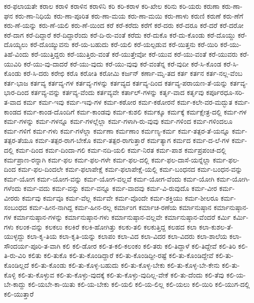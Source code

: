 {ಕರ-ಫಲಾಯತೇ
ಕರಾಲ
ಕರಾಳಿ
ಕರಾಳಿನ
ಕರಾಳಿನಿ
ಕರಿ
ಕರಿ-ಕರಾಳ
ಕರಿ-ಖೇಲ
ಕರಿನು
ಕರಿ-ಯರು
ಕರುಣಾ
ಕರು-ಣಾ-ಘನ
ಕರು-ಣಾ-ನಿಧಿಯೆ
ಕರು-ಣಾ-ಪೂರಿತ
ಕರು-ಣಾ-ಮಯ
ಕರು-ಣಾ-ಮಯಿ
ಕರು-ಣಾಳು
ಕರುಣಿ
ಕರುಣೆ
ಕರು-ಣೆಗೆ
ಕರು-ಣೆ-ಯನ್ನು
ಕರು-ಣೆ-ಯಲಿ
ಕರು-ಣೆ-ಯಿಂದ
ಕರೆ
ಕರೆ-ಕರೆದು
ಕರೆಗೆ
ಕರೆ-ದರು
ಕರೆ-ದರೂ
ಕರೆ-ದರೆ
ಕರೆ-ದರೋ
ಕರೆ-ದಾಗ
ಕರೆ-ದಿದ್ದಾರೆ
ಕರೆ-ದಿದ್ದಾರೆಂದು
ಕರೆ-ದಿ-ರು-ವಂತೆ
ಕರೆದು
ಕರೆ-ದುಕೊ
ಕರೆ-ದು-ಕೊಂಡು
ಕರೆ-ದೊಯ್ದು
ಕರೆ-ದೊಯ್ಯಲು
ಕರೆ-ದೊಯ್ಯುವನು
ಕರೆ-ಯ-ಬಹುದು
ಕರೆ-ಯಲಿ
ಕರೆ-ಯಲ್ಪಡುವ
ಕರೆ-ಯಿತ್ತನು
ಕರೆ-ಯಿರಿ
ಕರೆ-ಯು-ತಿಹೆ-ವಿಂದು
ಕರೆ-ಯುತ್ತಿದ್ದರು
ಕರೆ-ಯುತ್ತಿರು-ವಂತೆ
ಕರೆ-ಯುತ್ತೇವೋ
ಕರೆ-ಯುವ
ಕರೆ-ಯು-ವಂತೆ
ಕರೆ-ಯುವರು
ಕರೆ-ಯುವಿರಿ
ಕರೆ-ಯು-ವು-ದಾದರೆ
ಕರೆ-ಯು-ವುದು
ಕರೆ-ಯು-ವುವು
ಕರೆ-ವಂತೆನ್ನ
ಕರೆ-ವುದೀ
ಕರೆ-ಸಿ-ಕೊಂಡ
ಕರೆ-ಸಿ-ಕೊಂಡು
ಕರೆ-ಸಿ-ದರು
ಕರೇಛಿ
ಕರೊ
ಕರೋತಿ
ಕರೋಮಿ
ಕರ್ಜನ್
ಕರ್ಣಾ-ಮೃ-ತದ
ಕರ್ತ
ಕರ್ತನ
ಕರ್ತ-ನಲ್ಲ-ವೆಂಬ
ಕರ್ತ-ಭಾಜ
ಕರ್ತವ್ಯ
ಕರ್ತವ್ಯ-ಗಳ
ಕರ್ತವ್ಯ-ಗಳನ್ನು
ಕರ್ತವ್ಯದ
ಕರ್ತವ್ಯ-ದಿಂದ
ಕರ್ತವ್ಯ-ಪರಾಯಣ-ತೆ-ಯನ್ನು
ಕರ್ತವ್ಯ-ಭಾರ-ದಿಂದ
ಕರ್ತವ್ಯ-ವನ್ನು
ಕರ್ತವ್ಯ-ವೆಂದು
ಕರ್ತವ್ಯವೇ
ಕರ್ತಾಲ್-ಗಳನ್ನು
ಕರ್ತೃ-ವಾದ
ಕರ್ತೃವು
ಕರ್ಪೂರಧೂ-ಸರಿ-ತ-ವಾದ
ಕರ್ಮ
ಕರ್ಮ-ಇವು
ಕರ್ಮ-ಇವು-ಗಳ
ಕರ್ಮ-ಕಠೋರ
ಕರ್ಮ-ಕಠೋರನೆ
ಕರ್ಮ-ಕಲೇ-ವರ-ಮದ್ಭುತ
ಕರ್ಮ-ಕಾಂಡದ
ಕರ್ಮ-ಕಾಂಡ-ದೊಂದಿಗೆ
ಕರ್ಮ-ಕಾಂಡವು
ಕರ್ಮ-ಕುಶಲಿ
ಕರ್ಮಕ್ಕೂ
ಕರ್ಮಕ್ಕೆ
ಕರ್ಮಕ್ಷೇತ್ರ-ದಲ್ಲಿ
ಕರ್ಮ-ಗಳ
ಕರ್ಮ-ಗಳನ್ನು
ಕರ್ಮ-ಗಳನ್ನೂ
ಕರ್ಮ-ಗಳಲ್ಲೆಲ್ಲಾ
ಕರ್ಮ-ಗಳಾಗಿ-ರು-ವುವು
ಕರ್ಮ-ಗಳಿಂದ
ಕರ್ಮ-ಗಳಿಂದಲೂ
ಕರ್ಮ-ಗಳಿಗೆ
ಕರ್ಮ-ಗಳು
ಕರ್ಮ-ಗಳೆಲ್ಲಾ
ಕರ್ಮಣಾ
ಕರ್ಮಣಾಂ
ಕರ್ಮಣ್ಯ-ಕರ್ಮ
ಕರ್ಮ-ತತ್ಪರ-ತೆ-ಯನ್ನೂ
ಕರ್ಮ-ತತ್ಪರ-ತೆಯೂ
ಕರ್ಮ-ತತ್ಪರ-ರಾಗ-ಬೇಕೊ
ಕರ್ಮ-ತತ್ಪರ-ರಾಗುತ್ತಾರೆ
ಕರ್ಮತ್ಯಾಗ
ಕರ್ಮದ
ಕರ್ಮ-ದ-ಲೆ-ಗಳ
ಕರ್ಮ-ದಲ್ಲಿ
ಕರ್ಮ-ದಿಂದ
ಕರ್ಮ-ದಿಂದಾ-ಗಲಿ
ಕರ್ಮ-ನದಿ-ಯಲಿ
ಕರ್ಮ-ನಿರತ
ಕರ್ಮ-ಪಾಶ
ಕರ್ಮಪ್ರಪಂಚ-ದಲ್ಲಿ
ಕರ್ಮಪ್ರಾಣ-ರನ್ನಾಗಿ
ಕರ್ಮ-ಫಲ
ಕರ್ಮ-ಫಲ-ಗಳೇ
ಕರ್ಮ-ಫಲ-ದಲ್ಲಿ
ಕರ್ಮ-ಫಲ-ದಾಸೆ-ಯನ್ನೆಲ್ಲಾ
ಕರ್ಮ-ಫಲ-ದಿಂದ
ಕರ್ಮ-ಫಲ-ದಿಂದಲೇ
ಕರ್ಮ-ಫಲಾಪೇಕ್ಷೆ
ಕರ್ಮ-ಫಲಾಪೇಕ್ಷೆ-ಯಲ್ಲಿ
ಕರ್ಮ-ಬಂಧನದ
ಕರ್ಮ-ಬಂಧನ-ವನ್ನು
ಕರ್ಮ-ಯೋಗ
ಕರ್ಮ-ಯೋಗ-ವನ್ನು
ಕರ್ಮ-ಯೋಗ-ವಲ್ಲವೆ
ಕರ್ಮ-ಯೋಗ-ವೆಂದು
ಕರ್ಮ-ಯೋಗಿ
ಕರ್ಮ-ಯೋಗಿ-ಗಳೆಂದು
ಕರ್ಮ-ವದು
ಕರ್ಮ-ವನ್ನು
ಕರ್ಮ-ವನ್ನೂ
ಕರ್ಮ-ವಾದವು
ಕರ್ಮ-ವಿ-ರುವುದೊ
ಕರ್ಮ-ವೀರ
ಕರ್ಮ-ವೀರರು
ಕರ್ಮವು
ಕರ್ಮವೂ
ಕರ್ಮ-ವೆಲ್ಲ
ಕರ್ಮವೇ
ಕರ್ಮ-ವೊಂದೇ
ಕರ್ಮ-ಶಕ್ತಿಯು
ಕರ್ಮ-ಶೀಲರೂ
ಕರ್ಮ-ಸಂಬಂಧದ
ಕರ್ಮ-ಹೀನ-ನಾಗಿದ್ದ
ಕರ್ಮ-ಹೀನ-ರಲ್ಲ
ಕರ್ಮಾಂಗ
ಕರ್ಮಾಚ-ರಣೆಯ
ಕರ್ಮಾನುಷ್ಠಾನ
ಕರ್ಮಾನುಷ್ಠಾನ-ಗಳ
ಕರ್ಮಾನುಷ್ಠಾನ-ಗಳನ್ನು
ಕರ್ಮಾನುಷ್ಠಾನ-ಗಳು
ಕರ್ಮಾನುಷ್ಠಾನ-ವಲ್ಲವೇ
ಕರ್ಮಾನುಷ್ಠಾನ-ವೆಂದರೆ
ಕರ್ಮಿ
ಕರ್ಮಿ-ಗಳು
ಕಲಂಕ-ವನ್ನು
ಕಲಕಲು
ಕಲಕಿರೆ
ಕಲಕಿ-ಹೋಗಿತ್ತು
ಕಲಕು-ತಲಿ
ಕಲಕುತ್ತಿದ್ದ
ಕಲಹದ
ಕಲಾ
ಕಲಾ-ಕುಶಲ-ತೆ-ಯುಳ್ಳದ್ದು
ಕಲಾ-ಕೃ-ತಿಯ
ಕಲಾ-ಕೃತಿ-ಯನ್ನು
ಕಲಾಪಂ
ಕಲಾ-ವಿದ
ಕಲಾ-ವಿದರ
ಕಲಾ-ವಿದರು
ಕಲಾ-ಶಾಲೆಯ
ಕಲಾ-ಸೌಂದರ್ಯ-ಪೂರಿ-ತ-ವಾಗಿ
ಕಲಿ
ಕಲಿ-ಡೋರ
ಕಲಿ-ತ-ಕಲಿ-ಕಲಂಕಂ
ಕಲಿ-ತರು
ಕಲಿ-ತಿದ್ದಾಳೆ
ಕಲಿ-ತಿದ್ದೇವೆ
ಕಲಿ-ತಿರಿ
ಕಲಿ-ತಿ-ರು-ವಿರಿ
ಕಲಿತು
ಕಲಿ-ತುಕೊ
ಕಲಿ-ತು-ಕೊಂಡಿದ್ದಾರೆ
ಕಲಿ-ತು-ಕೊಂಡಿದ್ದೀ-ರಷ್ಟೆ
ಕಲಿ-ತು-ಕೊಂಡಿದ್ದೇವೆ
ಕಲಿ-ತು-ಕೊಂಡಿಲ್ಲದೆ
ಕಲಿ-ತು-ಕೊಂಡು
ಕಲಿ-ತು-ಕೊಳ್ಳ-ಬಹುದು
ಕಲಿ-ತು-ಕೊಳ್ಳ-ಬೇಕು
ಕಲಿ-ತು-ಕೊಳ್ಳ-ಬೇ-ಕೇನು
ಕಲಿ-ತು-ಕೊಳ್ಳಿ
ಕಲಿ-ತು-ಕೊಳ್ಳುವ
ಕಲಿ-ತು-ಕೊಳ್ಳು-ವುದಕ್ಕೆ
ಕಲಿ-ತು-ಕೊಳ್ಳು-ವುದಿಲ್ಲ-ವೇಕೆ
ಕಲಿ-ತು-ದೆಂದು
ಕಲಿ-ತೆವು
ಕಲಿ-ಯ-ಬೇ-ಕಾದ್ದು
ಕಲಿ-ಯಬೇ-ಕಾ-ಯಿತು
ಕಲಿ-ಯ-ಬೇಕು
ಕಲಿ-ಯಲಿ
ಕಲಿ-ಯ-ಲಿಲ್ಲ
ಕಲಿ-ಯಲು
ಕಲಿ-ಯಿರಿ
ಕಲಿ-ಯುಗ-ದಲ್ಲಿ
ಕಲಿ-ಯುತ್ತಾರೆ
}
